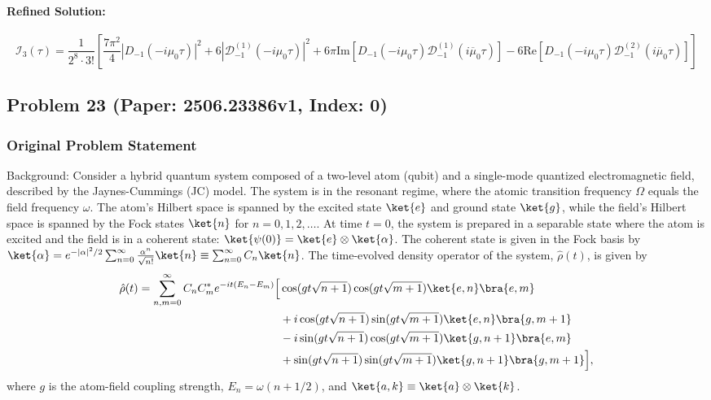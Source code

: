 \documentclass[10pt]{article}
\begin{document}
\paragraph*{Refined Solution:}
\[ \mathcal{I}_{3}(\tau) = \frac{1}{2^8 \cdot 3!}\left[\frac{7\pi^2}{4}\left|D_{-1}\left(-i\mu_{0}\tau\right)\right|^{2}+6\left|\mathcal{D}^{\left(1\right)}_{-1}\left(-i\mu_{0}\tau\right)\right|^{2}+6\pi\mathrm{Im}\left[D_{-1}\left(-i\mu_{0}\tau\right)\mathcal{D}^{\left(1\right)}_{-1}\left(i\overline\mu_0\tau\right)\right]-6\mathrm{Re}\left[D_{-1}\left(-i\mu_{0}\tau\right)\mathcal{D}^{\left(2\right)}_{-1}\left(i\overline\mu_0\tau\right)\right]\right] \]

\newpage
\subsection*{Problem 23 (Paper: 2506.23386v1, Index: 0)}

\subsubsection*{Original Problem Statement}
Background:
Consider a hybrid quantum system composed of a two-level atom (qubit) and a single-mode quantized electromagnetic field, described by the Jaynes-Cummings (JC) model. The system is in the resonant regime, where the atomic transition frequency $\Omega$ equals the field frequency $\omega$. The atom's Hilbert space is spanned by the excited state $\ket{e}$ and ground state $\ket{g}$, while the field's Hilbert space is spanned by the Fock states $\ket{n}$ for $n=0, 1, 2, \dots$. At time $t=0$, the system is prepared in a separable state where the atom is excited and the field is in a coherent state: $\ket{\psi(0)} = \ket{e} \otimes \ket{\alpha}$. The coherent state is given in the Fock basis by $\ket{\alpha} = e^{-|\alpha|^2/2} \sum_{n=0}^{\infty} \frac{\alpha^n}{\sqrt{n!}} \ket{n} \equiv \sum_{n=0}^{\infty} C_n \ket{n}$. The time-evolved density operator of the system, $\hat{\rho}(t)$, is given by
\begin{align*}
\hat{\rho}(t) = \sum_{n,m=0}^{\infty} C_n C_m^* e^{-i t (E_n - E_m)} \Big[ & \cos(gt\sqrt{n+1}) \cos(gt\sqrt{m+1}) \ket{e,n}\bra{e,m} \\
& + i \cos(gt\sqrt{n+1}) \sin(gt\sqrt{m+1}) \ket{e,n}\bra{g,m+1} \\
& - i \sin(gt\sqrt{n+1}) \cos(gt\sqrt{m+1}) \ket{g,n+1}\bra{e,m} \\
& + \sin(gt\sqrt{n+1}) \sin(gt\sqrt{m+1}) \ket{g,n+1}\bra{g,m+1} \Big],
\end{align*}
where $g$ is the atom-field coupling strength, $E_n = \omega(n+1/2)$, and $\ket{a,k} \equiv \ket{a} \otimes \ket{k}$.
\end{document}
